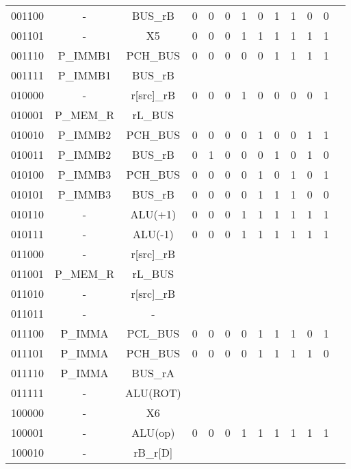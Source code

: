 \documentclass[10pt]{book}
\begin{document}
\begin{longtable}{|c|c|c||c|c|c||c|c|c|c|c|c|c|}
001100 & - 		& BUS\_rB 		& 0 & 0 & 0  & 1 & 0 & 1 & 1 & 0 & 0 \\
001101 & - 		& X5 			& 0 & 0 & 0  & 1 & 1 & 1 & 1 & 1 & 1 \\
001110 & P\_IMMB1	& PCH\_BUS		& 0 & 0 & 0  & 0 & 0 & 1 & 1 & 1 & 1 \\
001111 & P\_IMMB1	& BUS\_rB 		&   &   &    &   &   &   &   &   &   \\
\hline
010000 & - 		& r[src]\_rB 	& 0 & 0 & 0  & 1 & 0 & 0 & 0 & 0 & 1 \\ %
010001 & P\_MEM\_R 	& rL\_BUS 		&   &   &    &   &   &   &   &   &   \\ %
010010 & P\_IMMB2 	& PCH\_BUS 	& 0 & 0 & 0  & 0 & 1 & 0 & 0 & 1 & 1 \\
010011 & P\_IMMB2 	& BUS\_rB 		& 0 & 1 & 0  & 0 & 0 & 1 & 0 & 1 & 0 \\
010100 & P\_IMMB3	& PCH\_BUS 	& 0 & 0 & 0  & 0 & 1 & 0 & 1 & 0 & 1 \\
010101 & P\_IMMB3	& BUS\_rB 		& 0 & 0 & 0  & 0 & 1 & 1 & 1 & 0 & 0 \\
010110 & - 		& ALU(+1) 		& 0 & 0 & 0  & 1 & 1 & 1 & 1 & 1 & 1 \\
010111 & - 		& ALU(-1) 		& 0 & 0 & 0  & 1 & 1 & 1 & 1 & 1 & 1 \\
\hline
011000 & - 		& r[src]\_rB 	&   &   &    &   &   &   &   &   &   \\ %
011001 & P\_MEM\_R 	& rL\_BUS  	&   &   &    &   &   &   &   &   &   \\ %
011010 & - 		& r[src]\_rB	&   &   &    &   &   &   &   &   &   \\ %
011011 & - 		& - 			&   &   &    &   &   &   &   &   &   \\ 
011100 & P\_IMMA 	& PCL\_BUS 	& 0 & 0 & 0  & 0 & 1 & 1 & 1 & 0 & 1 \\
011101 & P\_IMMA 	& PCH\_BUS 	& 0 & 0 & 0  & 0 & 1 & 1 & 1 & 1 & 0 \\
011110 & P\_IMMA 	& BUS\_rA 		&   &   &    &   &   &   &   &   &   \\ 
011111 & - 		& ALU(ROT)		&   &   &    &   &   &   &   &   &   \\ 
\hline
100000 & - 		& X6 			&   &   &    &   &   &   &   &   &   \\ 
100001 & - 		& ALU(op)		& 0 & 0 & 0  & 1 & 1 & 1 & 1 & 1 & 1 \\
100010 & - 		& rB\_r[D]		& \\

\end{longtable}
\end{document}
